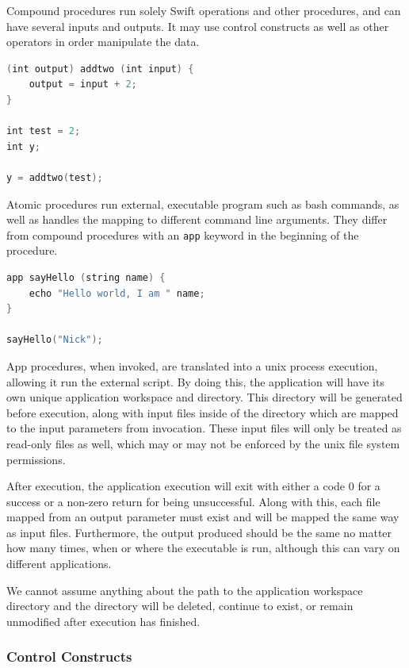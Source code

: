         Compound procedures run solely Swift operations and other procedures, and can have several inputs and outputs. It may use control constructs as well as other operators in order manipulate the data.

        \begin{lstlisting}[language=swift]
(int output) addtwo (int input) {
    output = input + 2;
}

int test = 2;
int y;

y = addtwo(test);
        \end{lstlisting}

        Atomic procedures run external, executable program such as bash commands, as well as handles the mapping to different command line arguments. They differ from compound procedures with an \texttt{app} keyword in the beginning of the procedure.
        \begin{lstlisting}[language=swift]
app sayHello (string name) {
    echo "Hello world, I am " name;
}

sayHello("Nick");
    \end{lstlisting}
    App procedures, when invoked, are translated into a unix process execution, allowing it run the external script. By doing this, the application will have its own unique application workspace and directory. This directory will be generated before execution, along with input files inside of the directory which are mapped to the input parameters from invocation. These input files will only be treated as read-only files as well, which may or may not be enforced by the unix file system permissions.

    After execution, the application execution will exit with either a code 0 for a success or a non-zero return for being unsuccessful. Along with this, each file mapped from an output parameter must exist and will be mapped the same way as input files. Furthermore, the output produced should be the same no matter how many times, when or where the executable is run, although this can vary on different applications.

    We cannot assume anything about the path to the application workspace directory and the directory will be deleted, continue to exist, or remain unmodified after execution has finished.

    \subsubsection{Control Constructs}

